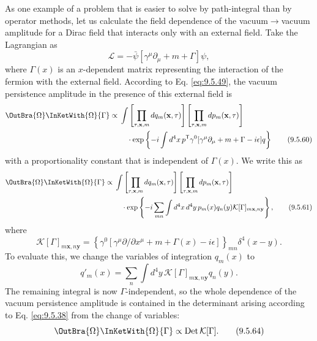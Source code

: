 As one example of a problem that is easier to solve by path-integral than by
operator methods, let us calculate the field dependence of the vacuum$\to$vacuum
amplitude for a Dirac field that interacts only with an external field. Take
the Lagrangian as
\begin{equation}
\mathcal{L}=-\bar\psi[\gamma^\mu\partial_\mu+m+\Gamma]\psi,
\tag{9.5.59}\label{eq:9.5.59}
\end{equation}
where $\Gamma(x)$ is an $x$-dependent matrix representing the interaction of
the fermion with the external field. According to Eq. \eqref{eq:9.5.49}, the vacuum
persistence amplitude in the presence of this external field is
\begin{align}
\OutBra{\Omega}\InKetWith{\Omega}{\Gamma}
\propto{}&\int
 \left[\prod_{\tau,\mathbf{x},m}dq_m(\mathbf{x},\tau)\right]
 \left[\prod_{\tau,\mathbf{x},m}dp_m(\mathbf{x},\tau)\right]
\notag\\
&\quad\cdot\exp\left\{-i\int d^4x\,
 p^{\mathsf T}\gamma^0[\gamma^\mu\partial_\mu+m+\Gamma-i\epsilon]q\right\}
\tag{9.5.60}\label{eq:9.5.60}
\end{align}
with a proportionality constant that is independent of $\Gamma(x)$. We write
this as
\begin{align}
\OutBra{\Omega}\InKetWith{\Omega}{\Gamma}
\propto{}&\int
 \left[\prod_{\tau,\mathbf{x},m}dq_m(\mathbf{x},\tau)\right]
 \left[\prod_{\tau,\mathbf{x},m}dp_m(\mathbf{x},\tau)\right]
\notag\\
&\quad\cdot\exp\left\{-i\sum_{mn}\int d^4x\,d^4y\,
 p_m(x)q_n(y)\mathcal{K}[\Gamma]_{m\mathbf{x},n\mathbf{y}}\right\},
\tag{9.5.61}\label{eq:9.5.61}
\end{align}
where
\begin{equation}
\mathcal{K}[\Gamma]_{m\mathbf{x},n\mathbf{y}}
=\left\{\gamma^0[\gamma^\mu\partial/\partial x^\mu
 +m+\Gamma(x)-i\epsilon]\right\}_{mn}\delta^4(x-y).
\tag{9.5.62}\label{eq:9.5.62}
\end{equation}
To evaluate this, we change the variables of integration $q_m(x)$ to
\begin{equation}
q'_m(x)=\sum_n\int d^4y\,
 \mathcal{K}[\Gamma]_{m\mathbf{x},n\mathbf{y}}q_n(y).
\tag{9.5.63}\label{eq:9.5.63}
\end{equation}
The remaining integral is now $\Gamma$-independent, so the whole dependence of
the vacuum persistence amplitude is contained in the determinant arising
according to Eq. \eqref{eq:9.5.38} from the change of variables:
\begin{equation}
\OutBra{\Omega}\InKetWith{\Omega}{\Gamma}
\propto\operatorname{Det}\mathcal{K}[\Gamma].
\tag{9.5.64}\label{eq:9.5.64}
\end{equation}
